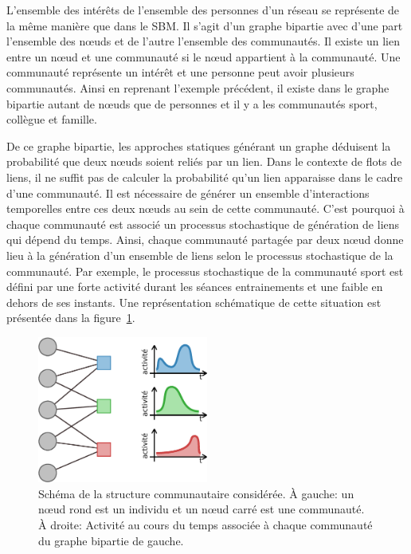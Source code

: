 L'ensemble des intérêts de l'ensemble des personnes d'un réseau se représente de la même manière que dans le SBM.
Il s'agit d'un graphe bipartie avec d'une part l'ensemble des n\oe uds et de l'autre l'ensemble des communautés.
Il existe un lien entre un n\oe ud et une communauté si le n\oe ud appartient à la communauté.
Une communauté représente un intérêt et une personne peut avoir plusieurs communautés.
Ainsi en reprenant l'exemple précédent, il existe dans le graphe bipartie autant de n\oe uds que de personnes et il y a les communautés sport, collègue et famille.

De ce graphe bipartie, les approches statiques générant un graphe déduisent la probabilité que deux n\oe uds soient reliés par un lien.
Dans le contexte de flots de liens, il ne suffit pas de calculer la probabilité qu'un lien apparaisse dans le cadre d'une communauté.
Il est nécessaire de générer un ensemble d'interactions temporelles entre ces deux n\oe uds au sein de cette communauté.
C'est pourquoi à chaque communauté est associé un processus stochastique de génération de liens qui dépend du temps.
Ainsi, chaque communauté partagée par deux n\oe ud donne lieu à la génération d'un ensemble de liens selon le processus stochastique de la communauté.
Par exemple, le processus stochastique de la communauté sport est défini par une forte activité durant les séances entrainements et une faible en dehors de ses instants.
Une représentation schématique de cette situation est présentée dans la figure~\ref{fig:qualite_Generator}.



\begin{figure}
\centering
\includegraphics[width=0.5\textwidth]{img/Qualite/Generator}
\caption{Schéma de la structure communautaire considérée.
\`A gauche: un n\oe ud rond est un individu et un n\oe ud carré est une communauté.
\`A droite: Activité au cours du temps associée à chaque communauté du graphe bipartie de gauche.}
\label{fig:qualite_Generator}
\end{figure}

